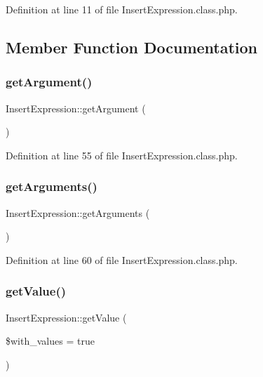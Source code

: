 Definition at line 11 of file Insert\+Expression.\+class.\+php.



\subsection{Member Function Documentation}
\hypertarget{classInsertExpression_aa0f93cc5194b4605d63f96b53f3d037d}{}\label{classInsertExpression_aa0f93cc5194b4605d63f96b53f3d037d} 
\subsubsection{\texorpdfstring{get\+Argument()}{getArgument()}}
{\footnotesize\ttfamily Insert\+Expression\+::get\+Argument (\begin{DoxyParamCaption}{ }\end{DoxyParamCaption})}



Definition at line 55 of file Insert\+Expression.\+class.\+php.

\hypertarget{classInsertExpression_aa18be08ea777a25c8f06505d8710ced2}{}\label{classInsertExpression_aa18be08ea777a25c8f06505d8710ced2} 
\subsubsection{\texorpdfstring{get\+Arguments()}{getArguments()}}
{\footnotesize\ttfamily Insert\+Expression\+::get\+Arguments (\begin{DoxyParamCaption}{ }\end{DoxyParamCaption})}



Definition at line 60 of file Insert\+Expression.\+class.\+php.

\hypertarget{classInsertExpression_ad9d21fa7983a8d93730c6d16b24a0c32}{}\label{classInsertExpression_ad9d21fa7983a8d93730c6d16b24a0c32} 
\subsubsection{\texorpdfstring{get\+Value()}{getValue()}}
{\footnotesize\ttfamily Insert\+Expression\+::get\+Value (\begin{DoxyParamCaption}\item[{}]{\$with\+\_\+values = {\ttfamily true} }\end{DoxyParamCaption})}



